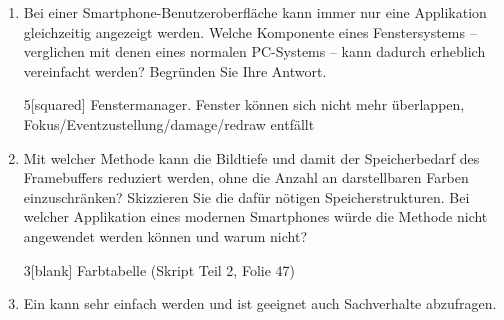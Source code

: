 
\begin{enumerate}

\item Bei einer Smartphone-Benutzeroberfläche kann immer nur eine Applikation
gleichzeitig angezeigt werden. Welche Komponente eines Fenstersystems --
verglichen mit denen eines normalen PC-Systems -- kann dadurch erheblich vereinfacht
werden? Begründen Sie Ihre Antwort.

\begin{solution}{5}[squared]
Fenstermanager. Fenster können sich nicht mehr überlappen,
Fokus/Eventzustellung/damage/redraw entfällt 
\end{solution}

\item Mit welcher Methode kann die Bildtiefe und damit der Speicherbedarf des
Framebuffers reduziert werden, ohne die Anzahl an darstellbaren Farben
einzuschränken? Skizzieren Sie die dafür nötigen Speicherstrukturen. Bei welcher
Applikation eines modernen Smartphones würde die Methode nicht angewendet werden
können und warum nicht?

\begin{solution}{3}[blank]
Farbtabelle (Skript Teil 2, Folie 47)
\end{solution}

\item Ein \wordline[Lückentext]{8em} kann sehr einfach \wordline[korrigiert]{6em} werden und ist geeignet auch \wordline[komplexe]{4em} Sachverhalte abzufragen.

\end{enumerate}
